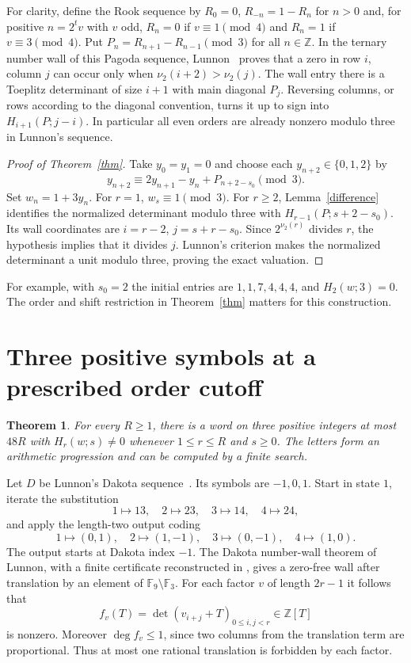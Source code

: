 \documentclass[11pt]{article}
\newtheorem{theorem}{Theorem}
\newcommand{\Z}{\mathbb Z}
\newcommand{\F}{\mathbb F}
\begin{document}
For clarity, define the Rook sequence by $R_0=0$, $R_{-n}=1-R_n$ for $n>0$ and, for positive $n=2^t v$ with $v$ odd, $R_n=0$ if $v\equiv1\pmod4$ and $R_n=1$ if $v\equiv3\pmod4$. Put $P_n=R_{n+1}-R_{n-1}\pmod3$ for all $n\in\Z$. In the ternary number wall of this Pagoda sequence, Lunnon~\cite[p.~145]{pagoda} proves that a zero in row $i$, column $j$ can occur only when $\nu_2(i+2)>\nu_2(j)$. The wall entry there is a Toeplitz determinant of size $i+1$ with main diagonal $P_j$. Reversing columns, or rows according to the diagonal convention, turns it up to sign into $H_{i+1}(P;j-i)$. In particular all even orders are already nonzero modulo three in Lunnon's sequence.

\begin{proof}[Proof of Theorem~\ref{thm}]
Take $y_0=y_1=0$ and choose each $y_{n+2}\in\{0,1,2\}$ by
\[
 y_{n+2}\equiv 2y_{n+1}-y_n+P_{n+2-s_0}\pmod3 .
\]
Set $w_n=1+3y_n$. For $r=1$, $w_s\equiv1\pmod3$. For $r\ge2$, Lemma~\ref{difference} identifies the normalized determinant modulo three with $H_{r-1}(P;s+2-s_0)$. Its wall coordinates are $i=r-2$, $j=s+r-s_0$. Since $2^{\nu_2(r)}$ divides $r$, the hypothesis implies that it divides $j$. Lunnon's criterion makes the normalized determinant a unit modulo three, proving the exact valuation.
\end{proof}
For example, with $s_0=2$ the initial entries are $1,1,7,4,4,4$, and $H_2(w;3)=0$. The order and shift restriction in Theorem~\ref{thm} matters for this construction.

\section{Three positive symbols at a prescribed order cutoff}
\begin{theorem}\label{cutoff}
For every $R\ge1$, there is a word on three positive integers at most $48R$ with $H_r(w;s)\ne0$ whenever $1\le r\le R$ and $s\ge0$. The letters form an arithmetic progression and can be computed by a finite search.
\end{theorem}
Let $D$ be Lunnon's Dakota sequence~\cite{dak}. Its symbols are $-1,0,1$. Start in state $1$, iterate the substitution
\[
 1\mapsto 13,\quad 2\mapsto 23,\quad 3\mapsto 14,\quad 4\mapsto 24,
\]
and apply the length-two output coding
\[
 1\mapsto(0,1),\quad 2\mapsto(1,-1),\quad
 3\mapsto(0,-1),\quad 4\mapsto(1,0).
\]
The output starts at Dakota index $-1$. The Dakota number-wall theorem of Lunnon, with a finite certificate reconstructed in \cite{dakcert}, gives a zero-free wall after translation by an element of $\F_9\setminus\F_3$. For each factor $v$ of length $2r-1$ it follows that
\[
 f_v(T)=\det(v_{i+j}+T)_{0\le i,j<r}\in\Z[T]
\]
is nonzero. Moreover $\deg f_v\le1$, since two columns from the translation term are proportional. Thus at most one rational translation is forbidden by each factor.
\end{document}

